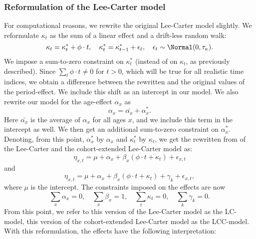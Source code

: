 \subsubsection{Reformulation of the Lee-Carter model}
For computational reasons, we rewrite the original Lee-Carter model slightly. We reformulate $\kappa_t$ as the sum of a linear effect and a drift-less random walk:
\begin{equation}
    \kappa_t = \kappa_t^* + \phi\cdot t, \quad \kappa_t^* = \kappa_{t-1}^* + \epsilon_t, \quad \epsilon_t \sim \Normal(0,\tau_{\kappa}).
\end{equation}
We impose a sum-to-zero constraint on $\kappa_t^*$ (instead of on $\kappa_t$, as previously described). Since $\sum_t \phi \cdot t \neq 0$ for $t > 0$, which will be true for all realistic time indices, we obtain a difference between the rewritten and the original values of the period-effect. We include this shift as an intercept in our model. We also rewrite our model for the age-effect $\alpha_x$ as 
\begin{equation}
    \alpha_x = \bar{\alpha_x} + \alpha_x^*.
\end{equation}
Here $\bar{\alpha_x}$ is the average of $\alpha_x$ for all ages $x$, and we include this term in the intercept as well. We then get an additional sum-to-zero constraint on $\alpha_x^*$. Denoting, from this point, $\alpha_x^*$ by $\alpha_x$ and $\kappa_t^*$ by $\kappa_t$, we get the rewritten from of the Lee-Carter and the cohort-extended Lee-Carter model as:
\begin{equation}
    \eta_{x,t} = \mu + \alpha_x + \beta_x(\phi \cdot t + \kappa_t) + \epsilon_{x,t}
    \label{eq:LC-rewritten}
\end{equation}
and
\begin{equation}
    \eta_{x,t} = \mu + \alpha_x + \beta_x(\phi \cdot t + \kappa_t) + \gamma_k + \epsilon_{x,t},
    \label{eq:LCC-rewritten}
\end{equation}
where $\mu$ is the intercept. The constraints imposed on the effects are now 
\begin{equation*}
    \sum_x \alpha_x = 0, \quad \sum_x \beta_x = 1, \quad \sum_t \kappa_t = 0,\quad \sum_k \gamma_k = 0. 
\end{equation*}
From this point, we refer to this version of the Lee-Carter model as the LC-model, this version of the cohort-extended Lee-Carter model as the LCC-model. With this reformulation, the effects have the following interpretation:
